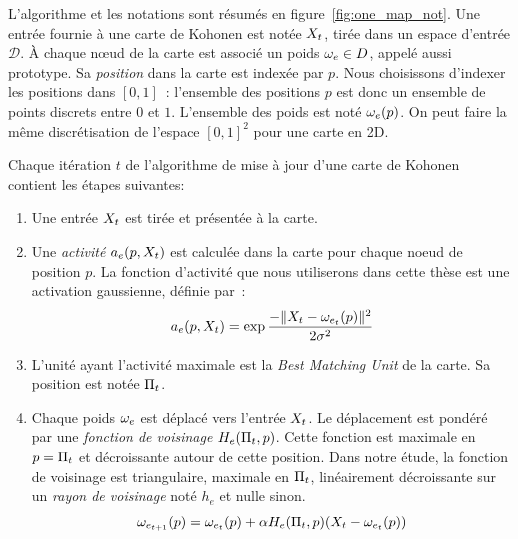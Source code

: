 \documentclass[../main]{subfiles}
\begin{document}
L'algorithme et les notations sont résumés en figure~\ref{fig:one_map_not}. Une entrée fournie à une carte de Kohonen est notée $X_t$, tirée dans un espace d'entrée $\mathcal{D}$. \`A chaque n\oe{}ud de la carte est associé un poids $\omega_e \in D$, appelé aussi prototype. Sa \emph{position} dans la carte est indexée par $p$. Nous choisissons d'indexer les positions dans $[0,1]$~: l'ensemble des positions $p$ est donc un ensemble de points discrets entre $0$ et $1$. L'ensemble des poids est noté $\omega_e(p)$. On peut faire la même discrétisation de l'espace $[0,1]^2$ pour une carte en 2D.

Chaque itération $t$ de l'algorithme de mise à jour d'une carte de Kohonen contient les étapes suivantes:
\begin{enumerate}
\item\label{enum:inp} Une entrée $X_t$ est tirée et présentée à la carte.
\item\label{enum:act} Une \emph{activité} $a_e(p,X_t)$ est calculée dans la carte pour chaque noeud de position $p$. La fonction d'activité que nous utiliserons dans cette thèse est une activation gaussienne, définie par~:
\begin{equation}\label{eq:act1som}
a_e(p, X_t) = \exp{\frac{-\lVert X_t-\omega_{e_t}(p) \rVert ^2}{2\sigma^2}}
\end{equation}
\item\label{enum:bmu} L'unité ayant l'activité maximale est la \emph{Best Matching Unit} de la carte. Sa position est notée $\Pi_t$.
\item Chaque poids $\omega_e$ est déplacé vers l'entrée $X_t$. Le déplacement est pondéré par une \emph{fonction de voisinage} $H_e(\Pi_t,p)$. Cette fonction est maximale en $p = \Pi_t$ et décroissante autour de cette position. Dans notre étude, la fonction de voisinage est triangulaire, maximale en $\Pi_t$, linéairement décroissante sur un \emph{rayon de voisinage} noté $h_e$ et nulle sinon.
\begin{equation}
\omega_{e_{t+1}}(p) = \omega_{e_t}(p) + \alpha H_e(\Pi_t,p)(X_t - \omega_{e_t}(p))
\label{eq:update}
\end{equation}
\end{enumerate}
\end{document}
